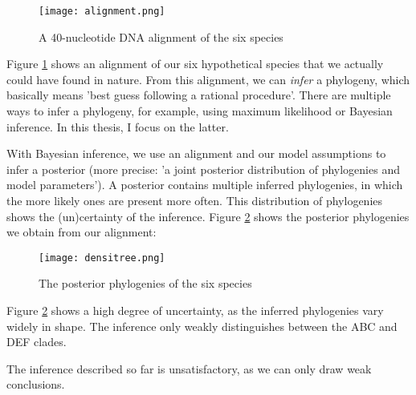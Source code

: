 \begin{figure}[H]
  \texttt{[image: alignment.png]}
  \caption{
    A 40-nucleotide DNA alignment of the six species
  }
  \label{fig:alignment}
\end{figure}

Figure \ref{fig:alignment} shows an alignment of our six hypothetical species
that we actually could have found in nature. From this alignment, we
can \emph{infer} a phylogeny, which basically means 'best guess following a 
rational procedure'. There are multiple ways to infer a phylogeny, for
example, using maximum likelihood or Bayesian inference. In this thesis, 
I focus on the latter.

With Bayesian inference, we use an alignment and our model assumptions to infer 
a posterior (more 
precise: 'a joint posterior distribution of phylogenies and model parameters').
A posterior contains multiple inferred phylogenies, in which the more likely
ones are present more often. This distribution of phylogenies shows the
(un)certainty of the inference. Figure \ref{fig:densitree} shows the
posterior phylogenies we obtain from our alignment:

\begin{figure}[H]
  \texttt{[image: densitree.png]}
  \caption{
    The posterior phylogenies of the six species
  }
  \label{fig:densitree}
\end{figure}

Figure \ref{fig:densitree} shows a high degree of uncertainty, as the
inferred phylogenies vary widely in shape. The inference only
weakly distinguishes between the ABC and DEF clades. 

The inference described so far is unsatisfactory, as we can only draw 
weak conclusions. 



